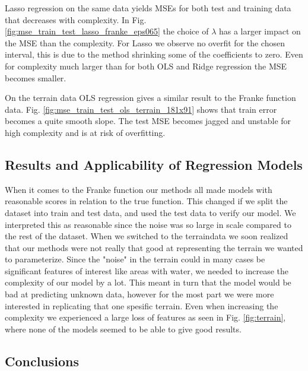 \documentclass[%
 reprint,
nofootinbib,
 amsmath,amssymb,
 aps,
]{revtex4-2}
\begin{document}
Lasso regression on the same data yields MSEs for both test and training data that decreases with complexity. In Fig. \ref{fig:mse_train_test_lasso_franke_eps065} the choice of $\lambda$ has a larger impact on the MSE than the complexity. For Lasso we observe no overfit for the chosen interval, this is due to the method shrinking some of the coefficients to zero. Even for complexity much larger than for both OLS and Ridge regression the MSE becomes smaller.

On the terrain data OLS regression gives a similar result to the Franke function data. Fig. \ref{fig:mse_train_test_ols_terrain_181x91} shows that train error becomes a quite smooth slope. The test MSE becomes jagged and unstable for high complexity and is at risk of overfitting.


\subsection{Results and Applicability of Regression Models}

When it comes to the Franke function our methods all made models with reasonable scores in relation to the true function. This changed if we split the dataset into train and test data, and used the test data to verify our model. We interpreted this as reasonable since the noise was so large in scale compared to the rest of the dataset. When we switched to the terraindata we soon realized that our methods were not really that good at representing the terrain we wanted to parameterize. Since the "noise" in the terrain could in many cases be significant features of interest like areas with water, we needed to increase the complexity of our model by a lot. This meant in turn that the model would be bad at predicting unknown data, however for the most part we were more interested in replicating that one spesific terrain. Even when increasing the complexity we experienced a large loss of features as seen in Fig. \ref{fig:terrain}, where none of the models seemed to be able to give good results.

\subsection{Conclusions}
\end{document}
